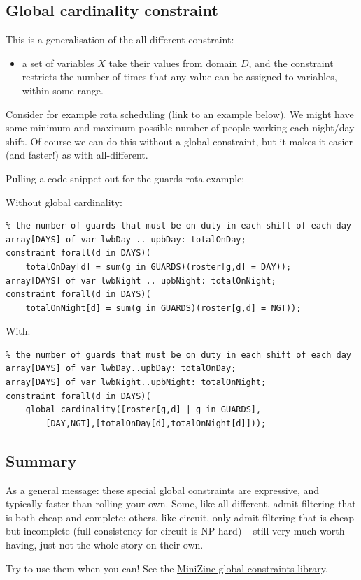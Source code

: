 \documentclass[11pt]{article}
\begin{document}
\subsection{Global cardinality constraint}

This is a generalisation of the all-different constraint:
\begin{itemize}
    \item a set of variables $X$ take their values from domain $D$, and the constraint restricts the number of times that any value can be assigned to variables, within some range.
\end{itemize}

Consider for example rota scheduling (link to an example below). We might have some minimum and maximum possible number of people working each night/day shift. Of course we can do this without a global constraint, but it makes it easier (and faster!) as with all-different.

Pulling a code snippet out for the guards rota example:

Without global cardinality:
\footnotesize
\begin{verbatim}
% the number of guards that must be on duty in each shift of each day
array[DAYS] of var lwbDay .. upbDay: totalOnDay;
constraint forall(d in DAYS)(
    totalOnDay[d] = sum(g in GUARDS)(roster[g,d] = DAY));
array[DAYS] of var lwbNight .. upbNight: totalOnNight;
constraint forall(d in DAYS)(
    totalOnNight[d] = sum(g in GUARDS)(roster[g,d] = NGT));
\end{verbatim}
\normalsize

With:
\footnotesize
\begin{verbatim}
% the number of guards that must be on duty in each shift of each day
array[DAYS] of var lwbDay..upbDay: totalOnDay;
array[DAYS] of var lwbNight..upbNight: totalOnNight;
constraint forall(d in DAYS)(
    global_cardinality([roster[g,d] | g in GUARDS],
        [DAY,NGT],[totalOnDay[d],totalOnNight[d]]));
\end{verbatim}
\normalsize

\subsection{Summary}

As a general message: these special global constraints are expressive, and typically faster than rolling your own. Some, like all-different, admit filtering that is both cheap and complete; others, like circuit, only admit filtering that is cheap but incomplete (full consistency for circuit is NP-hard) -- still very much worth having, just not the whole story on their own.

Try to use them when you can! See the \href{https://www.minizinc.org/doc-2.3.0/en/lib-globals.html}{MiniZinc global constraints library}.
\end{document}
